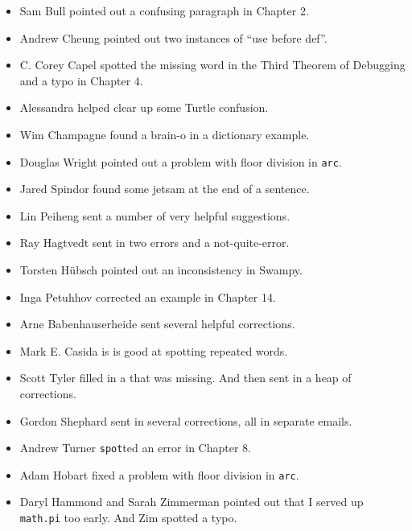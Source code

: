 \documentclass[10pt]{book}
\begin{document}
\begin{itemize}
\item Sam Bull pointed out a confusing paragraph in Chapter 2.

\item Andrew Cheung pointed out two instances of ``use before def''.

\item C. Corey Capel spotted the missing word in the Third Theorem
of Debugging and a typo in Chapter 4.

\item Alessandra helped clear up some Turtle confusion.

\item Wim Champagne found a brain-o in a dictionary example.

\item Douglas Wright pointed out a problem with floor division in
{\tt arc}.

\item Jared Spindor found some jetsam at the end of a sentence.

\item Lin Peiheng sent a number of very helpful suggestions.

\item Ray Hagtvedt sent in two errors and a not-quite-error.

\item Torsten H\"{u}bsch pointed out an inconsistency in Swampy.

\item Inga Petuhhov corrected an example in Chapter 14.

\item Arne Babenhauserheide sent several helpful corrections.

\item Mark E. Casida is is good at spotting repeated words.

\item Scott Tyler filled in a that was missing.  And then sent in
a heap of corrections.

\item Gordon Shephard sent in several corrections, all in separate
emails.

\item Andrew Turner {\tt spot}ted an error in Chapter 8.

\item Adam Hobart fixed a problem with floor division in {\tt arc}.

\item Daryl Hammond and Sarah Zimmerman pointed out that I served
up {\tt math.pi} too early.  And Zim spotted a typo.


\end{itemize}
\end{document}
